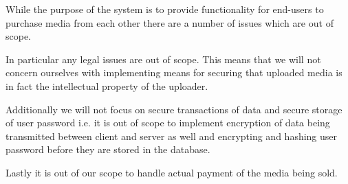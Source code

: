 \documentclass[../report.tex]{subfiles}
\begin{document}
While the purpose of the system is to provide functionality for end-users to purchase media from each other there are a number of issues which are out of scope. 

In particular any legal issues are out of scope. This means that we will not concern ourselves with implementing means for securing that uploaded media is in fact the intellectual property of the uploader. 

Additionally we will not focus on secure transactions of data and secure storage of user password i.e. it is out of scope to implement encryption of data being transmitted between client and server as well and encrypting and hashing user password before they are stored in the database. 

Lastly it is out of our scope to handle actual payment of the media being sold.
\end{document}
